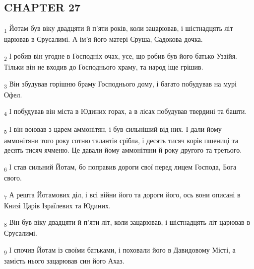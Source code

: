 \subsection{CHAPTER 27}
\begin{tcolorbox}
\textsubscript{1} Йотам був віку двадцяти й п'яти років, коли зацарював, і шістнадцять літ царював в Єрусалимі. А ім'я його матері Єруша, Садокова дочка.
\end{tcolorbox}
\begin{tcolorbox}
\textsubscript{2} І робив він угодне в Господніх очах, усе, що робив був його батько Уззійя. Тільки він не входив до Господнього храму, та народ іще грішив.
\end{tcolorbox}
\begin{tcolorbox}
\textsubscript{3} Він збудував горішню браму Господнього дому, і багато побудував на мурі Офел.
\end{tcolorbox}
\begin{tcolorbox}
\textsubscript{4} І побудував він міста в Юдиних горах, а в лісах побудував твердині та башти.
\end{tcolorbox}
\begin{tcolorbox}
\textsubscript{5} І він воював з царем аммонітян, і був сильніший від них. І дали йому аммонітяни того року сотню талантів срібла, і десять тисяч корів пшениці та десять тисяч ячменю. Це давали йому аммонітяни й року другого та третього.
\end{tcolorbox}
\begin{tcolorbox}
\textsubscript{6} І став сильний Йотам, бо поправив дороги свої перед лицем Господа, Бога свого.
\end{tcolorbox}
\begin{tcolorbox}
\textsubscript{7} А решта Йотамових діл, і всі війни його та дороги його, ось вони описані в Книзі Царів Ізраїлевих та Юдиних.
\end{tcolorbox}
\begin{tcolorbox}
\textsubscript{8} Він був віку двадцяти й п'яти літ, коли зацарював, і шістнадцять літ царював в Єрусалимі.
\end{tcolorbox}
\begin{tcolorbox}
\textsubscript{9} І спочив Йотам із своїми батьками, і поховали його в Давидовому Місті, а замість нього зацарював син його Ахаз.
\end{tcolorbox}

